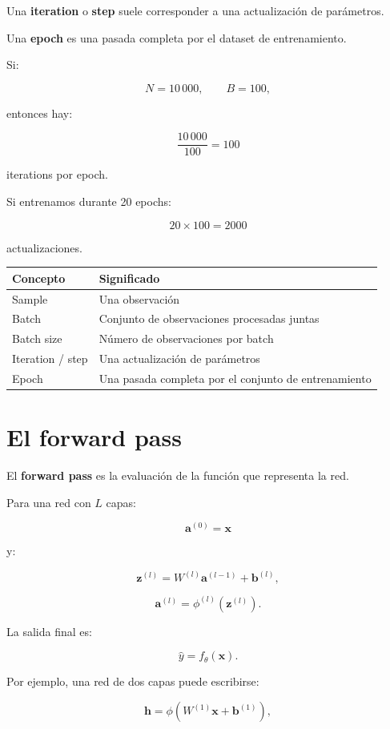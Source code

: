 \documentclass[
  letterpaper,
  DIV=11,
  numbers=noendperiod]{scrartcl}
\newcounter{none} %
\begin{document}
Una \textbf{iteration} o \textbf{step} suele corresponder a una
actualización de parámetros.

Una \textbf{epoch} es una pasada completa por el dataset de
entrenamiento.

Si:

\[
N=10\,000,
\qquad
B=100,
\]

entonces hay:

\[
\frac{10\,000}{100}=100
\]

iterations por epoch.

Si entrenamos durante 20 epochs:

\[
20\times100=2000
\]

actualizaciones.

{\def\LTcaptype{none} %
\begin{longtable}[]{@{}ll@{}}
\toprule\noalign{}
Concepto & Significado \\
\midrule\noalign{}
\endhead
\bottomrule\noalign{}
\endlastfoot
Sample & Una observación \\
Batch & Conjunto de observaciones procesadas juntas \\
Batch size & Número de observaciones por batch \\
Iteration / step & Una actualización de parámetros \\
Epoch & Una pasada completa por el conjunto de entrenamiento \\
\end{longtable}
}

\section{El forward pass}\label{el-forward-pass}

El \textbf{forward pass} es la evaluación de la función que representa
la red.

Para una red con \(L\) capas:

\[
\mathbf a^{(0)}=\mathbf x
\]

y:

\[
\mathbf z^{(l)}
=
W^{(l)}\mathbf a^{(l-1)}
+
\mathbf b^{(l)},
\]

\[
\mathbf a^{(l)}
=
\phi^{(l)}(\mathbf z^{(l)}).
\]

La salida final es:

\[
\hat y=f_\theta(\mathbf x).
\]

Por ejemplo, una red de dos capas puede escribirse:

\[
\mathbf h
=
\phi(W^{(1)}\mathbf x+\mathbf b^{(1)}),
\]
\end{document}

